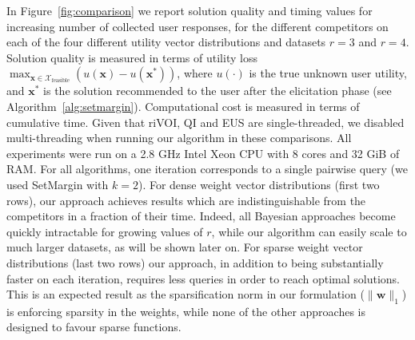 \documentclass{article}
\renewcommand\[{\begin{equation}}
\renewcommand\]{\end{equation}}
\newcommand{\calvar}[1]{\ensuremath{\mathcal{#1}}}
\newcommand{\calX}{\calvar{X}}
\newcommand{\vecvar}[1]{\ensuremath{\boldsymbol{#1}}}
\newcommand{\vw}{\vecvar{w}}
\newcommand{\vx}{\vecvar{x}}
\newcommand{\andrea}[1]{{\bf \textcolor{blue}{{\fbox{Andrea:} #1}}}}
\begin{document}
In Figure~\ref{fig:comparison} we report solution quality and timing
values for increasing number of collected user responses, for the
different competitors on each of the four different utility vector
distributions and datasets $r=3$ and $r=4$. Solution quality is
measured in terms of utility loss $ \max_{\vx\in\calX_\text{feasible}} \left( u(\vx) - u(\vx^*) \right)$,
where $u(\cdot)$ is the true unknown user utility, and $\vx^*$ is the
solution recommended to the user after the elicitation phase (see
Algorithm~\ref{alg:setmargin}). Computational cost is measured in
terms of cumulative time. Given that {\sc riVOI},  {\sc QI} and
{\sc EUS} are single-threaded, we disabled multi-threading when running our
algorithm in these comparisons. All experiments were run on a 2.8 GHz Intel
Xeon CPU with 8 cores and 32 GiB of RAM.
For all algorithms, one iteration corresponds to a single pairwise query (we
used {\sc SetMargin} with $k=2$).
For dense weight vector distributions (first two rows), our approach
achieves results which are indistinguishable from the competitors in a
fraction of their time.  Indeed, all Bayesian approaches
 become quickly intractable for growing values of $r$,
while our algorithm can easily scale to much larger datasets, as will
be shown later on. For sparse weight vector distributions (last two
rows) our approach, in addition to being substantially faster on each
iteration, requires less queries in order to reach optimal
solutions. This is an expected result as the sparsification norm in
our formulation ($\| \vw \|_1$) is enforcing sparsity in the weights, 
while none of the other approaches is %
designed to favour sparse functions.


\end{document}

